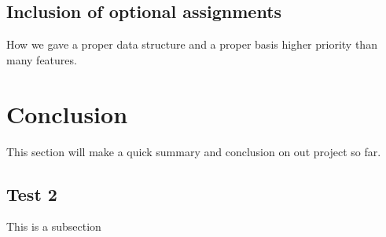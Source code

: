 \documentclass[a4paper,11pt]{article}
\begin{document}
\subsection{Inclusion of optional assignments} %
How we gave a proper data structure and a proper basis higher priority than many features.

\pagebreak
\section{Conclusion} %
\label{sec:Conclusion}
This section will make a quick summary and conclusion on out project so far.

\subsection{Test 2}

This is a subsection
\end{document}
